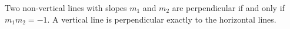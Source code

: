 \begin{theorem}\label{thm:perpendicular-slopes}
  Two non-vertical lines with slopes $m_1$ and $m_2$ are perpendicular if and
  only if $m_1 m_2 = -1$. A vertical line is perpendicular exactly to the
  horizontal lines.
\end{theorem}
